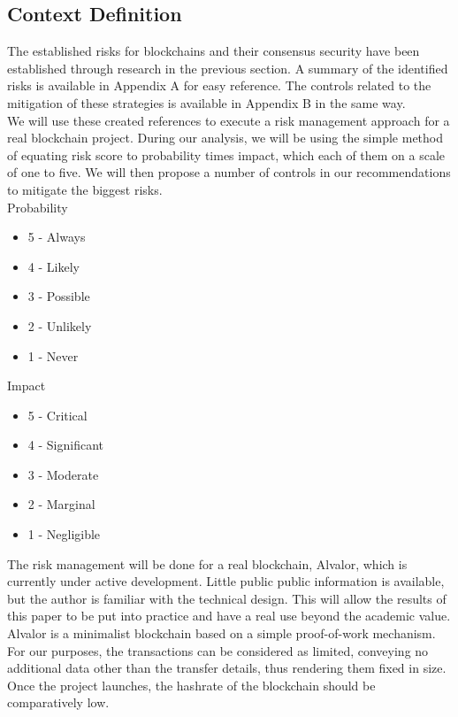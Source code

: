 \documentclass[12pt,a4paper]{article}
\begin{document}
\subsection{Context Definition}

The established risks for \glspl{blockchain} and their \gls{consensus} security have been established through research in the previous section. A summary of the identified risks is available in Appendix A for easy reference. The controls related to the mitigation of these strategies is available in Appendix B in the same way.\\

We will use these created references to execute a risk management approach for a real blockchain project. During our analysis, we will be using the simple method of equating risk score to probability times impact, which each of them on a scale of one to five. We will then propose a number of controls in our recommendations to mitigate the biggest risks.\\

Probability
\begin{itemize}
  \item 5 - Always
  \item 4 - Likely
  \item 3 - Possible
  \item 2 - Unlikely
  \item 1 - Never
\end{itemize}

Impact
\begin{itemize}
  \item 5 - Critical
  \item 4 - Significant
  \item 3 - Moderate
  \item 2 - Marginal
  \item 1 - Negligible
\end{itemize}

The risk management will be done for a real \gls{blockchain}, Alvalor, which is currently under active development. Little public public information is available, but the author is familiar with the technical design. This will allow the results of this paper to be put into practice and have a real use beyond the academic value.\\

Alvalor is a minimalist \gls{blockchain} based on a simple proof-of-work mechanism. For our purposes, the \glspl{transaction} can be considered as limited, conveying no additional data other than the transfer details, thus rendering them fixed in size. Once the project launches, the \gls{hashrate} of the \gls{blockchain} should be comparatively low.\\
\end{document}
